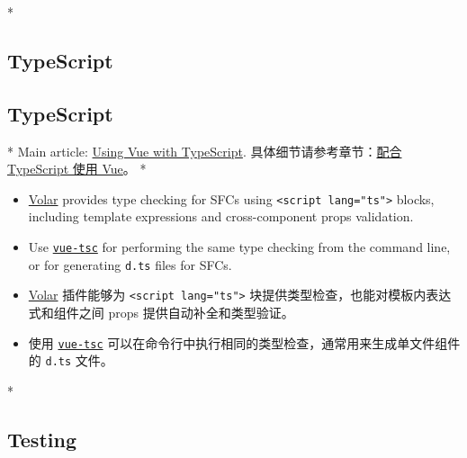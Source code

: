 \begin{paracol}{2}
 
\switchcolumn[0]*%
\subsection{TypeScript}
\switchcolumn
\subsection{TypeScript}
\switchcolumn[0]*%
Main article:
\href{https://vuejs.org/guide/typescript/overview.html}{Using Vue with
TypeScript}.
\switchcolumn
具体细节请参考章节：\href{https://cn.vuejs.org/guide/typescript/overview.html}{配合
TypeScript 使用 Vue}。
\switchcolumn[0]*%
\begin{itemize}
\item
  \href{https://github.com/johnsoncodehk/volar}{Volar} provides type
  checking for SFCs using
  \texttt{\textless{}script\ lang="ts"\textgreater{}} blocks, including
  template expressions and cross-component props validation.
\item
  Use
  \href{https://github.com/vuejs/language-tools/tree/master/packages/tsc}{\texttt{vue-tsc}}
  for performing the same type checking from the command line, or for
  generating \texttt{d.ts} files for SFCs.
\end{itemize}
\switchcolumn
\begin{itemize}
\item
  \href{https://github.com/johnsoncodehk/volar}{Volar} 插件能够为
  \texttt{\textless{}script\ lang="ts"\textgreater{}}
  块提供类型检查，也能对模板内表达式和组件之间 props
  提供自动补全和类型验证。
\item
  使用
  \href{https://github.com/vuejs/language-tools/tree/master/packages/tsc}{\texttt{vue-tsc}}
  可以在命令行中执行相同的类型检查，通常用来生成单文件组件的
  \texttt{d.ts} 文件。
\end{itemize} 
\switchcolumn[0]*%
\subsection{Testing}
\switchcolumn

\end{paracol}
